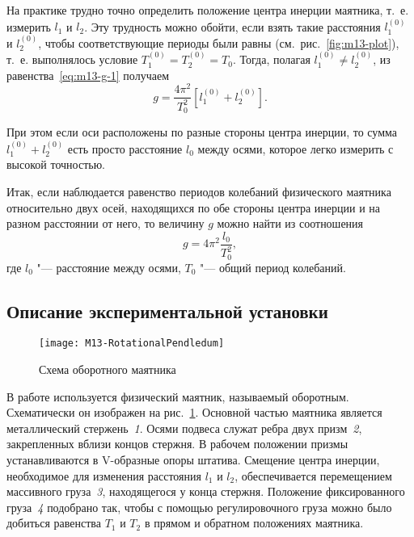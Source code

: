 \documentclass[a4paper, 12pt]{extarticle}
\begin{document}
На практике трудно точно определить положение центра инерции маятника, т.~е. измерить $l_1$ и $l_2$. Эту трудность можно обойти, если взять такие расстояния $l_1^{(0)}$ и $l_2^{(0)}$, чтобы соответствующие периоды были равны (см.~рис.~\ref{fig:m13-plot}), т.~е. выполнялось условие $T_1^{(0)} = T_2^{(0)} = T_0$. Тогда, полагая $l_1^{(0)} \ne l_2^{(0)}$, из равенства~\eqref{eq:m13-g-1} получаем %
\begin{equation}
\label{eq:m13-g-2}
g = \frac{4 \pi^2}{T_0^2} \left[ l_1^{(0)} + l_2^{(0)} \right] .
\end{equation}

При этом если оси расположены по разные стороны центра инерции, то сумма $l_1^{(0)} +l_2^{(0)}$ есть просто расстояние $l_0$ между осями, которое легко измерить с высокой точностью.

Итак, если наблюдается равенство периодов колебаний физического маятника относительно двух осей, находящихся по обе стороны центра инерции и на разном расстоянии от него, то величину $g$ можно найти из соотношения
\begin{equation}
\label{eq:m13-g-3}
g = 4 \pi^2 \frac{l_0}{T_0^2},
\end{equation}
где $l_0$  "--- расстояние между осями, $T_0$ "--- общий период колебаний.

\subsection{Описание экспериментальной установки}

\begin{figure}[h]
\begin{center}
\texttt{[image: M13-RotationalPendledum]}
\end{center}
\caption{Схема оборотного маятника \label{fig:m13-pendulum}}
\end{figure}

В работе используется физический маятник, называемый оборотным. Схематически он изображен на рис.~\ref{fig:m13-pendulum}. Основной частью маятника является металлический стержень~\emph{1}. Осями подвеса служат ребра двух призм~\emph{2}, закрепленных вблизи концов стержня. В рабочем положении призмы устанавливаются в V-образные опоры штатива. %
Смещение центра инерции, необходимое для изменения расстояния $l_1$ и $l_2$,  обеспечивается перемещением массивного груза~\emph{3}, находящегося у конца стержня. Положение фиксированного груза~\emph{4} подобрано так, чтобы с помощью регулировочного груза можно было добиться равенства $T_1$ и $T_2$ в прямом и обратном положениях маятника.
\end{document}

